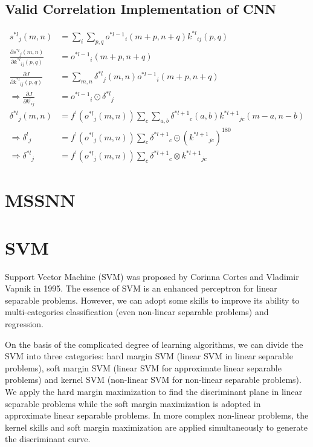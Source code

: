 \documentclass[runningheads,openany]{xhlPaper}
\begin{document}
\subsection{Valid Correlation Implementation of CNN}
\begin{equation}
\label{equ:corr_cnn}
\begin{aligned}
{s^{*l}}_j(m,n) &= \sum\limits_i {\sum\limits_{p,q} {{o^{*l - 1}}_i(m + p,n + q){k^{*l}}_{ij}(p,q)} } \\
\frac{{\partial {s^{*l}}_j(m,n)}}{{\partial {k^{*l}}_{ij}(p,q)}} &= {o^{*l - 1}}_i(m + p,n + q)\\
\frac{{\partial J}}{{\partial {k^{*l}}_{ij}(p,q)}} &= \sum\limits_{m,n} {{\delta ^{*l}}_j\left( {m,n} \right){o^{*l - 1}}_i(m + p,n + q)} \\
 \Rightarrow \frac{{\partial J}}{{\partial {k^l}_{ij}}} &= {o^{*l - 1}}_i \odot {\delta ^{*l}}_j\\
{\delta ^{*l}}_j\left( {m,n} \right) &= {f^{'}}\left( {{o^{*l}}_j\left( {m,n} \right)} \right)\sum\limits_c {\sum\limits_{a,b} {{\delta ^{*l + 1}}_c\left( {a,b} \right){k^{*l + 1}}_{jc}\left( {m - a,n - b} \right)} } \\
 \Rightarrow {\delta ^l}_j &= {f^{'}}\left( {{o^{*l}}_j\left( {m,n} \right)} \right)\sum\limits_c {{\delta ^{*l + 1}}_c \odot {{\left( {{k^{*l + 1}}_{jc}} \right)}^{180}}} \\
 \Rightarrow {\delta ^{*l}}_j &= {f^{'}}\left( {{o^{*l}}_j\left( {m,n} \right)} \right)\sum\limits_c {{\delta ^{*l + 1}}_c \otimes {k^{*l + 1}}_{jc}} 
\end{aligned}
\end{equation}

\section{MSSNN}


\section{SVM}
Support Vector Machine (SVM) was proposed by Corinna Cortes and Vladimir Vapnik in 1995\cite{CORTES_SVM_1995}.
The essence of SVM is an enhanced perceptron for linear separable problems. However, we can adopt some skills to improve its ability to multi-categories classification (even non-linear separable problems) and regression.

On the basis of the complicated degree of learning algorithms, we can divide the SVM into three categories: hard margin SVM (linear SVM in linear separable problems), soft margin SVM (linear SVM for approximate linear separable problems) and kernel SVM (non-linear SVM for non-linear separable problems)\cite{HangLi_Statistic_Learning}. We apply the hard margin maximization to find the discriminant plane in linear separable problems while the soft margin maximization is adopted in approximate linear separable problems. In more complex non-linear problems, the kernel skills and soft margin maximization are applied simultaneously to generate the discriminant curve.
\end{document}
